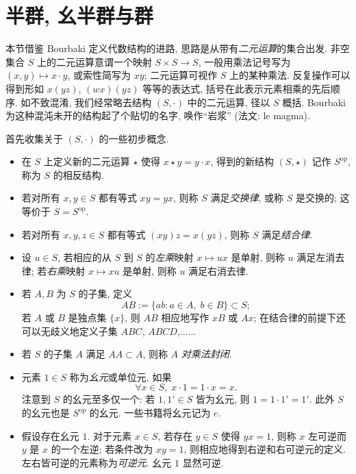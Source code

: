 \section{半群, 幺半群与群}\label{sec:group-and-monoid}
本节借鉴 Bourbaki \cite{Bou-Alg1} 定义代数结构的进路, 思路是从带有\emph{二元运算}的集合出发. 非空集合 $S$ 上的二元运算意谓一个映射 $S \times S \to S$, 一般用乘法记号写为 $(x, y) \mapsto x \cdot y$, 或索性简写为 $xy$; 二元运算可视作 $S$ 上的某种乘法. 反复操作可以得到形如 $x(yz)$, $(wx)(yz)$ 等等的表达式, 括号在此表示元素相乘的先后顺序. 如不致混淆, 我们经常略去结构 $(S, \cdot)$ 中的二元运算, 径以 $S$ 概括. Bourbaki 为这种混沌未开的结构起了个贴切的名字, 唤作``岩浆'' (法文: le magma). 

首先收集关于 $(S, \cdot)$ 的一些初步概念.
\begin{itemize}
	\item 在 $S$ 上定义新的二元运算 $\star$ 使得 $x \star y = y \cdot x$, 得到的新结构 $(S, \star)$ 记作 $S^\text{op}$, 称为 $S$ 的相反结构.
	\item 若对所有 $x, y \in S$ 都有等式 $xy=yx$, 则称 $S$ 满足\emph{交换律}, 或称 $S$ 是交换的; 这等价于 $S = S^\text{op}$.
	\item 若对所有 $x, y, z \in S$ 都有等式 $(xy)z=x(yz)$, 则称 $S$ 满足\emph{结合律}.
	\item 设 $u \in S$, 若相应的从 $S$ 到 $S$ 的\emph{左乘}映射 $x \mapsto ux$ 是单射, 则称 $u$ 满足左消去律; 若\emph{右乘}映射 $x \mapsto xu$ 是单射, 则称 $u$ 满足右消去律.
	\item 若 $A, B$ 为 $S$ 的子集, 定义
		\[ A B := \{ab : a \in A, \; b \in B \} \subset S; \]
		若 $A$ 或 $B$ 是独点集 $\{x\}$, 则 $AB$ 相应地写作 $xB$ 或 $Ax$; 在结合律的前提下还可以无歧义地定义子集 $ABC$, $ABCD$,......
	\item 若 $S$ 的子集 $A$ 满足 $A A \subset A$, 则称 $A$ \emph{对乘法封闭}.
	\item 元素 $1 \in S$ 称为\emph{幺元}或单位元, 如果 
		\[ \forall x \in S, \; x \cdot 1 = 1 \cdot x = x. \]
		注意到 $S$ 的幺元至多仅一个: 若 $1, 1' \in S$ 皆为幺元, 则 $1 = 1 \cdot 1' = 1'$. 此外 $S$ 的幺元也是 $S^\text{op}$ 的幺元. 一些书籍将幺元记为 $e$.
	\item 假设存在幺元 $1$. 对于元素 $x \in S$, 若存在 $y \in S$ 使得 $yx = 1$, 则称 $x$ 左可逆而 $y$ 是 $x$ 的一个左逆; 若条件改为 $xy=1$, 则相应地得到右逆和右可逆元的定义. 左右皆可逆的元素称为\emph{可逆元}. 幺元 $1$ 显然可逆.
\end{itemize}

